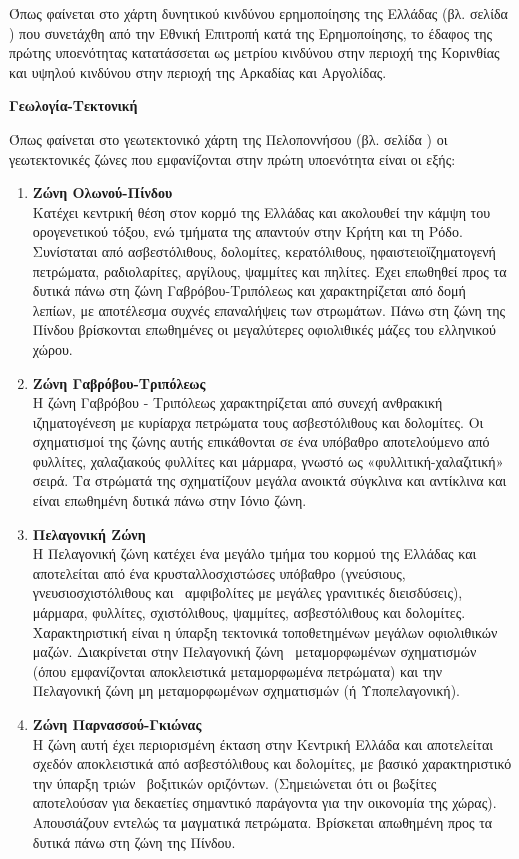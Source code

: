 \documentclass[12pt]{article}
\begin{document}
 	Όπως φαίνεται στο χάρτη δυνητικού κινδύνου ερημοποίησης της Ελλάδας (βλ. σελίδα \pageref{erimopoiisi}) που συνετάχθη από την Εθνική Επιτροπή κατά της Ερημοποίησης, το έδαφος της πρώτης υποενότητας κατατάσσεται ως μετρίου κινδύνου στην περιοχή της Κορινθίας και υψηλού κινδύνου στην περιοχή της Αρκαδίας και Αργολίδας.
 	
 	\textbf{Γεωλογία-Τεκτονική}
 	
 	Όπως φαίνεται στο γεωτεκτονικό χάρτη της Πελοποννήσου (βλ. σελίδα \pageref{geotektonikes}) οι γεωτεκτονικές ζώνες που εμφανίζονται στην πρώτη υποενότητα είναι οι εξής:
 	
 	\begin{enumerate}
 		\item \textbf{Ζώνη Ολωνού-Πίνδου} \\
 		Κατέχει κεντρική θέση στον κορμό της Ελλάδας και ακολουθεί την κάμψη του ορογενετικού τόξου, ενώ τμήματα της απαντούν στην Κρήτη και τη Ρόδο. Συνίσταται από ασβεστόλιθους, δολομίτες, κερατόλιθους, ηφαιστειοϊζηματογενή πετρώματα, ραδιολαρίτες, αργίλους, ψαμμίτες και πηλίτες. Έχει επωθηθεί προς τα δυτικά πάνω στη ζώνη Γαβρόβου-Τριπόλεως και χαρακτηρίζεται από δομή λεπίων, με αποτέλεσμα συχνές επαναλήψεις των στρωμάτων. Πάνω στη ζώνη της Πίνδου βρίσκονται επωθημένες οι μεγαλύτερες οφιολιθικές μάζες του ελληνικού χώρου.
 		\item \textbf{Ζώνη Γαβρόβου-Τριπόλεως} \\
 		Η ζώνη Γαβρόβου - Τριπόλεως χαρακτηρίζεται από συνεχή ανθρακική ιζηματογένεση με κυρίαρχα πετρώματα τους ασβεστόλιθους και δολομίτες. Οι σχηματισμοί της ζώνης αυτής επικάθονται σε ένα υπόβαθρο αποτελούμενο από φυλλίτες, χαλαζιακούς φυλλίτες και μάρμαρα, γνωστό ως «φυλλιτική-χαλαζιτική» σειρά. Τα στρώματά της σχηματίζουν μεγάλα ανοικτά σύγκλινα και αντίκλινα και είναι επωθημένη δυτικά πάνω στην Ιόνιο ζώνη.
 		\item \textbf{Πελαγονική Ζώνη} \\
 		Η Πελαγονική ζώνη κατέχει ένα μεγάλο τμήμα του κορμού της Ελλάδας και αποτελείται από ένα κρυσταλλοσχιστώσες υπόβαθρο (γνεύσιους, γνευσιοσχιστόλιθους και  αμφιβολίτες με μεγάλες γρανιτικές διεισδύσεις), μάρμαρα, φυλλίτες, σχιστόλιθους, ψαμμίτες, ασβεστόλιθους και δολομίτες. Χαρακτηριστική είναι η ύπαρξη τεκτονικά τοποθετημένων μεγάλων οφιολιθικών μαζών. Διακρίνεται στην Πελαγονική ζώνη  μεταμορφωμένων σχηματισμών (όπου εμφανίζονται αποκλειστικά μεταμορφωμένα πετρώματα) και την Πελαγονική ζώνη μη μεταμορφωμένων σχηματισμών (ή Υποπελαγονική).
 		\item \textbf{Ζώνη Παρνασσού-Γκιώνας} \\
 		Η ζώνη αυτή έχει περιορισμένη έκταση στην Κεντρική Ελλάδα και αποτελείται σχεδόν αποκλειστικά από ασβεστόλιθους και δολομίτες, με βασικό χαρακτηριστικό την ύπαρξη τριών  βοξιτικών οριζόντων. (Σημειώνεται ότι οι βωξίτες αποτελούσαν για δεκαετίες σημαντικό παράγοντα για την οικονομία της χώρας). Απουσιάζουν εντελώς τα μαγματικά πετρώματα. Βρίσκεται απωθημένη προς τα δυτικά πάνω στη ζώνη της Πίνδου.
 	\end{enumerate}
 
\end{document}

